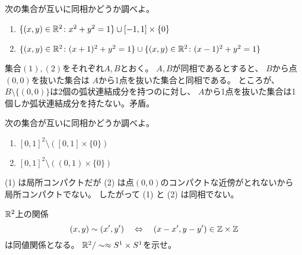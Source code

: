 \documentclass[report]{jlreq}
\begin{document}
\begin{problem}[幾何学II 1.5]
    次の集合が互いに同相かどうか調べよ。
    \begin{enumerate}
        \item $\{ (x, y) \in \mathbb{R}^2 \colon x^2 + y^2 = 1 \} \cup [-1, 1] \times \{0\}$
        \item $\{ (x, y) \in \mathbb{R}^2 \colon (x + 1)^2 + y^2 = 1 \}
            \cup \{ (x, y) \in \mathbb{R}^2 \colon (x - 1)^2 + y^2 = 1 \}$
    \end{enumerate}
\end{problem}

\begin{answer}
    集合$(1), (2)$をそれぞれ$A, B$とおく。
    $A, B$が同相であるとすると、
    $B$から点$(0, 0)$を抜いた集合は
    $A$から1点を抜いた集合と同相である。
    ところが、$B \setminus \{(0, 0)\}$は2個の弧状連結成分を持つのに対し、
    $A$から1点を抜いた集合は1個しか弧状連結成分を持たない。矛盾。
\end{answer}

\begin{problem}[幾何学II 1.6]
    次の集合が互いに同相かどうか調べよ。
    \begin{enumerate}
        \item $[0, 1]^2 \setminus ([0, 1] \times \{0\})$
        \item $[0, 1]^2 \setminus ((0, 1) \times \{0\})$
    \end{enumerate}
\end{problem}

\begin{answer}
    (1) は局所コンパクトだが
    (2) は点$(0, 0)$のコンパクトな近傍がとれないから
    局所コンパクトでない。
    したがって (1) と (2) は同相でない。
\end{answer}


\begin{problem}[幾何学II 1.8]
    $\mathbb{R}^2$上の関係
    \begin{equation}
        (x, y) \sim (x', y') \quad \Leftrightarrow \quad
            (x - x', y - y') \in \mathbb{Z} \times \mathbb{Z}
    \end{equation}
    は同値関係となる。
    $\mathbb{R}^2/\sim \approx S^1 \times S^1$を示せ。
\end{problem}
\end{document}
